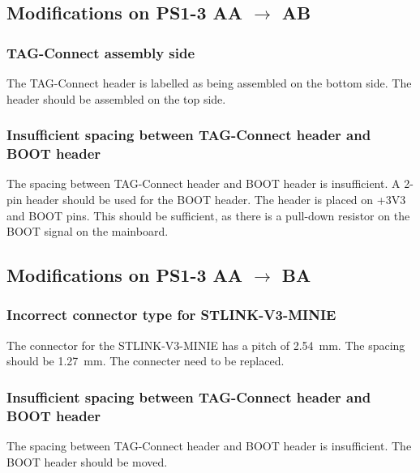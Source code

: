 \subsection{Modifications on PS1-3 AA $\to$ AB}

\subsubsection{TAG-Connect assembly side}
The TAG-Connect header is labelled as being assembled on the bottom side. The header should be assembled on the top side. 

\subsubsection{Insufficient spacing between TAG-Connect header and BOOT header}
The spacing between TAG-Connect header and BOOT header is insufficient. A 2-pin header should be used for the BOOT header. The header is placed on +3V3 and BOOT pins. This should be sufficient, as there is a pull-down resistor on the BOOT signal on the mainboard. 

\subsection{Modifications on PS1-3 AA $\to$ BA}

\subsubsection{Incorrect connector type for STLINK-V3-MINIE}
The connector for the STLINK-V3-MINIE has a pitch of \qty{2.54}{\milli\meter}. The spacing should be \qty{1.27}{\milli\meter}. The connecter need to be replaced. 

\subsubsection{Insufficient spacing between TAG-Connect header and BOOT header}
The spacing between TAG-Connect header and BOOT header is insufficient. The BOOT header should be moved. 

